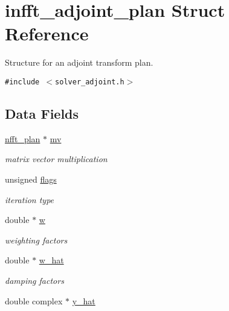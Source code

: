 \hypertarget{structinfft__adjoint__plan}{
\section{infft\_\-adjoint\_\-plan Struct Reference}
\label{structinfft__adjoint__plan}
}
Structure for an adjoint transform plan.  


{\tt \#include $<$solver\_\-adjoint.h$>$}

\subsection*{Data Fields}
\begin{CompactItemize}
\item 
\hypertarget{structinfft__adjoint__plan_o0}{
\hyperlink{structnfft__plan}{nfft\_\-plan} $\ast$ \hyperlink{structinfft__adjoint__plan_o0}{mv}}
\label{structinfft__adjoint__plan_o0}

\begin{CompactList}\small\item\em matrix vector multiplication \item\end{CompactList}\item 
\hypertarget{structinfft__adjoint__plan_o1}{
unsigned \hyperlink{structinfft__adjoint__plan_o1}{flags}}
\label{structinfft__adjoint__plan_o1}

\begin{CompactList}\small\item\em iteration type \item\end{CompactList}\item 
\hypertarget{structinfft__adjoint__plan_o2}{
double $\ast$ \hyperlink{structinfft__adjoint__plan_o2}{w}}
\label{structinfft__adjoint__plan_o2}

\begin{CompactList}\small\item\em weighting factors \item\end{CompactList}\item 
\hypertarget{structinfft__adjoint__plan_o3}{
double $\ast$ \hyperlink{structinfft__adjoint__plan_o3}{w\_\-hat}}
\label{structinfft__adjoint__plan_o3}

\begin{CompactList}\small\item\em damping factors \item\end{CompactList}\item 
\hypertarget{structinfft__adjoint__plan_o4}{
double complex $\ast$ \hyperlink{structinfft__adjoint__plan_o4}{y\_\-hat}}
\label{structinfft__adjoint__plan_o4}


\end{CompactItemize}
